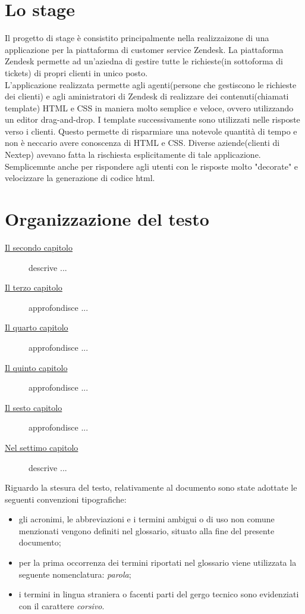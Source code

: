 \section{Lo stage}
Il progetto di stage è consistito principalmente nella realizzaizone di una applicazione per la piattaforma di customer service Zendesk. La piattaforma Zendesk permette ad un'aziedna di gestire tutte le richieste(in sottoforma di tickets) di propri clienti in unico posto. \\ L'applicazione realizzata permette agli agenti(persone che gestiscono le richieste dei clienti) e agli aministratori di Zendesk di realizzare dei contenuti(chiamati template) HTML e CSS in maniera molto semplice e veloce, ovvero utilizzando un editor drag-and-drop. I template successivamente sono utilizzati nelle risposte verso i clienti. Questo permette di risparmiare una notevole quantità di tempo e non è neccario avere conoscenza di HTML e CSS. Diverse aziende(clienti di Nextep) avevano fatta la rischiesta esplicitamente di tale applicazione. Semplicemnte anche per rispondere agli utenti con le risposte molto "decorate" e velocizzare la generazione di codice html.
\section{Organizzazione del testo}

\begin{description}
    \item[{\hyperref[cap:processi-metodologie]{Il secondo capitolo}}] descrive ...
    
    \item[{\hyperref[cap:descrizione-stage]{Il terzo capitolo}}] approfondisce ...
    
    \item[{\hyperref[cap:analisi-requisiti]{Il quarto capitolo}}] approfondisce ...
    
    \item[{\hyperref[cap:progettazione-codifica]{Il quinto capitolo}}] approfondisce ...
    
    \item[{\hyperref[cap:verifica-validazione]{Il sesto capitolo}}] approfondisce ...
    
    \item[{\hyperref[cap:conclusioni]{Nel settimo capitolo}}] descrive ...
\end{description}

Riguardo la stesura del testo, relativamente al documento sono state adottate le seguenti convenzioni tipografiche:
\begin{itemize}
	\item gli acronimi, le abbreviazioni e i termini ambigui o di uso non comune menzionati vengono definiti nel glossario, situato alla fine del presente documento;
	\item per la prima occorrenza dei termini riportati nel glossario viene utilizzata la seguente nomenclatura: \emph{parola}\glsfirstoccur;
	\item i termini in lingua straniera o facenti parti del gergo tecnico sono evidenziati con il carattere \emph{corsivo}.
\end{itemize}